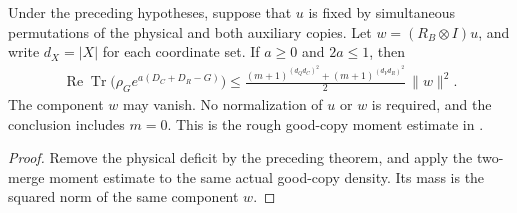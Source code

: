 \begin{theorem}
\label{thm:replica_good_physical_exponential_bound}
\leanok
Under the preceding hypotheses, suppose that $u$ is fixed by simultaneous
permutations of the physical and both auxiliary copies. Let
$w=(R_B\otimes I)u$, and write $d_X=|X|$ for each coordinate set.
If $a\geq0$ and $2a\leq1$, then
\begin{align*}
 \operatorname{Re}\operatorname{Tr}\bigl(\rho_G e^{a(D_C+D_R-G)}\bigr)
 \leq
 \frac{(m+1)^{(d_Qd_C)^2}+(m+1)^{(d_Vd_R)^2}}{2}\,\|w\|^2.
\end{align*}
The component $w$ may vanish. No normalization of $u$ or $w$ is
required, and the conclusion includes $m=0$. This is the rough
good-copy moment estimate in
\cite[Section~8, lines~520--555]{OpenAI2026AreaLaw}.
\end{theorem}
\begin{proof}
\leanok
{}
Remove the physical deficit by the preceding theorem, and apply the
two-merge moment estimate to the same actual good-copy density.
Its mass is the squared norm of the same component $w$.
\end{proof}
